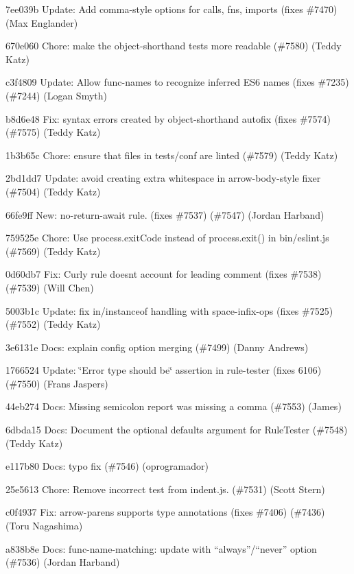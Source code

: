 \begin{DoxyItemize}
\item 7ee039b Update\+: Add comma-\/style options for calls, fns, imports (fixes \#7470) (Max Englander)
\item 670e060 Chore\+: make the {\ttfamily object-\/shorthand} tests more readable (\#7580) (Teddy Katz)
\item c3f4809 Update\+: Allow {\ttfamily func-\/names} to recognize inferred E\+S6 names (fixes \#7235) (\#7244) (Logan Smyth)
\item b8d6e48 Fix\+: syntax errors created by {\ttfamily object-\/shorthand} autofix (fixes \#7574) (\#7575) (Teddy Katz)
\item 1b3b65c Chore\+: ensure that files in tests/conf are linted (\#7579) (Teddy Katz)
\item 2bd1dd7 Update\+: avoid creating extra whitespace in {\ttfamily arrow-\/body-\/style} fixer (\#7504) (Teddy Katz)
\item 66fe9ff New\+: {\ttfamily no-\/return-\/await} rule. (fixes \#7537) (\#7547) (Jordan Harband)
\item 759525e Chore\+: Use process.\+exit\+Code instead of process.\+exit() in bin/eslint.\+js (\#7569) (Teddy Katz)
\item 0d60db7 Fix\+: Curly rule doesn\textquotesingle{}t account for leading comment (fixes \#7538) (\#7539) (Will Chen)
\item 5003b1c Update\+: fix in/instanceof handling with {\ttfamily space-\/infix-\/ops} (fixes \#7525) (\#7552) (Teddy Katz)
\item 3e6131e Docs\+: explain config option merging (\#7499) (Danny Andrews)
\item 1766524 Update\+: \char`\"{}\+Error type should be\char`\"{} assertion in rule-\/tester (fixes 6106) (\#7550) (Frans Jaspers)
\item 44eb274 Docs\+: Missing semicolon report was missing a comma (\#7553) (James)
\item 6dbda15 Docs\+: Document the optional defaults argument for Rule\+Tester (\#7548) (Teddy Katz)
\item e117b80 Docs\+: typo fix (\#7546) (oprogramador)
\item 25e5613 Chore\+: Remove incorrect test from indent.\+js. (\#7531) (Scott Stern)
\item c0f4937 Fix\+: {\ttfamily arrow-\/parens} supports type annotations (fixes \#7406) (\#7436) (Toru Nagashima)
\item a838b8e Docs\+: {\ttfamily func-\/name-\/matching}\+: update with “always”/“never” option (\#7536) (Jordan Harband)

\end{DoxyItemize}
